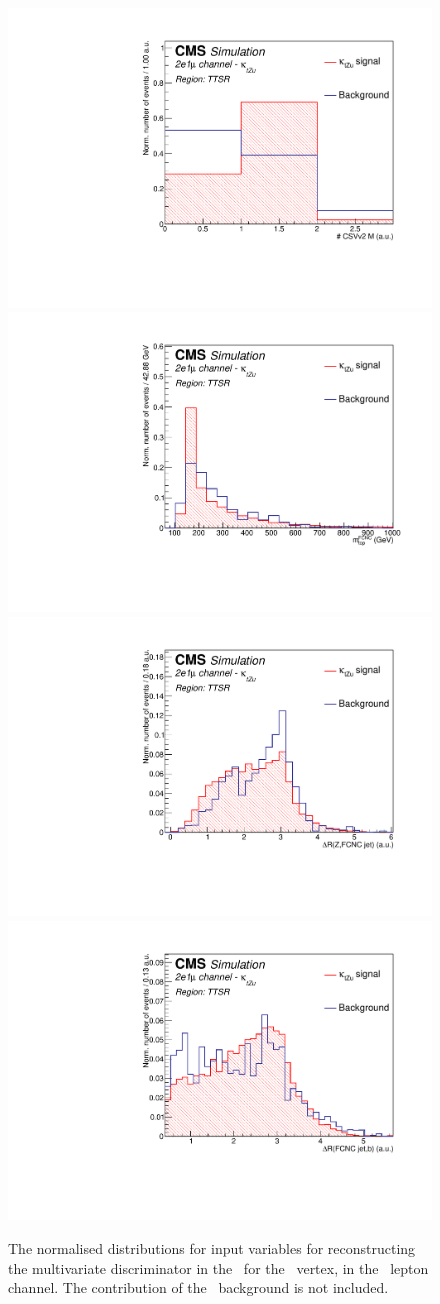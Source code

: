 \begin{figure}[htbp]
	\includegraphics[width=0.3\linewidth]{6_Search/Figures/PlotsTechnics/NJets_CSVv2MZuttoppaireeu_norm}
	\includegraphics[width=0.3\linewidth]{6_Search/Figures/PlotsTechnics/FCNCtop_MZuttoppaireeu_norm}
	\includegraphics[width=0.3\linewidth]{6_Search/Figures/PlotsTechnics/dRZcZuttoppaireeu_norm}
	\includegraphics[width=0.3\linewidth]{6_Search/Figures/PlotsTechnics/dRSMjetLightjetZuttoppaireeu_norm}
	\caption{The normalised distributions for input variables for reconstructing the multivariate discriminator in the \TTSR\ for the \Zut\ vertex, in the \eemu\ lepton channel. The contribution of the \NPL\ background is not included.}
	\label{fig:toppairZutnormalizedeeu}
\end{figure}

